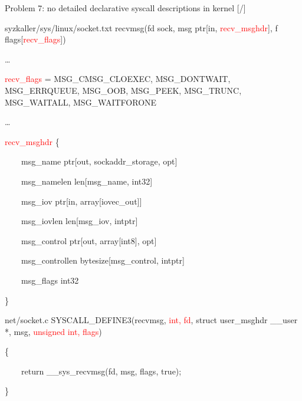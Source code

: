 \documentclass[unicode,aspectratio=169]{beamer}
\begin{document}
\begin{frame}{Problem 7: no detailed declarative syscall descriptions in kernel \hfill [\insertframenumber/\inserttotalframenumber]}
\begin{block}{syzkaller/sys/linux/socket.txt}
\scriptsize
recvmsg(fd sock, msg ptr[in, \textcolor{red}{recv\_msghdr}], f flags[\textcolor{red}{recv\_flags}])

\ldots

\textcolor{red}{recv\_flags} = MSG\_CMSG\_CLOEXEC, MSG\_DONTWAIT, MSG\_ERRQUEUE, MSG\_OOB, MSG\_PEEK, MSG\_TRUNC, MSG\_WAITALL, MSG\_WAITFORONE

\ldots

\textcolor{red}{recv\_msghdr} \{

\ \ \ \ msg\_name	ptr[out, sockaddr\_storage, opt]

\ \ \ \ msg\_namelen	len[msg\_name, int32]

\ \ \ \ msg\_iov		ptr[in, array[iovec\_out]]

\ \ \ \ msg\_iovlen	len[msg\_iov, intptr]

\ \ \ \ msg\_control	ptr[out, array[int8], opt]

\ \ \ \ msg\_controllen	bytesize[msg\_control, intptr]

\ \ \ \ msg\_flags	int32

\}
\end{block}

\begin{block}{net/socket.c}
\scriptsize
SYSCALL\_DEFINE3(recvmsg, \textcolor{red}{int, fd}, struct user\_msghdr \_\_user *, msg, \textcolor{red}{unsigned int, flags})

\{

\ \ \ \ return \_\_sys\_recvmsg(fd, msg, flags, true);

\}
\end{block}
\end{frame}
\end{document}
